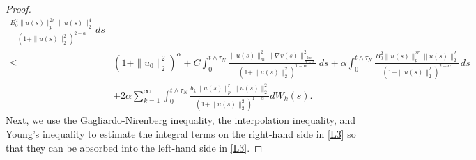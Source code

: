 \documentclass[10pt,a4paper]{amsart}
\begin{document}
\begin{proof}
\begin{align}
		\frac{{B_0^2}\|u(s)\|_p^{2r}\|u(s)\|_2^4}
		{(1+\|u(s)\|_2^2)^{2-\alpha}}\,ds
		\nonumber\\
		\le&(1+\|u_0\|_2^2)^\alpha
		+C\int_0^{t\wedge{\tau_N}}
		\frac{\|u(s)\|_m^2\|\nabla v(s)\|_{\frac{2m}{m-2}}^2}
		{(1+\|u(s)\|_2^2)^{1-\alpha}}\,ds
		+\alpha\int_0^{t\wedge{\tau_N}}
		\frac{{B_0^2}\|u(s)\|_p^{2r}\|u(s)\|_2^2}
		{(1+\|u(s)\|_2^2)^{2-\alpha}}\,ds
		\nonumber\\
		&
+2\alpha\sum_{k=1}^\infty\int_0^{t\wedge{\tau_N}}
		\frac{b_k\|u(s)\|_p^r\|u(s)\|_2^2}
		{(1+\|u(s)\|_2^2)^{1-\alpha}}dW_k(s).
	\end{align}
    Next, we use the Gagliardo-Nirenberg inequality, the interpolation inequality, and Young's inequality to estimate the  integral terms on the right-hand side in \eqref{L3} so that they can be absorbed into the left-hand side in \eqref{L3}. 
    

\end{proof}
\end{document}
